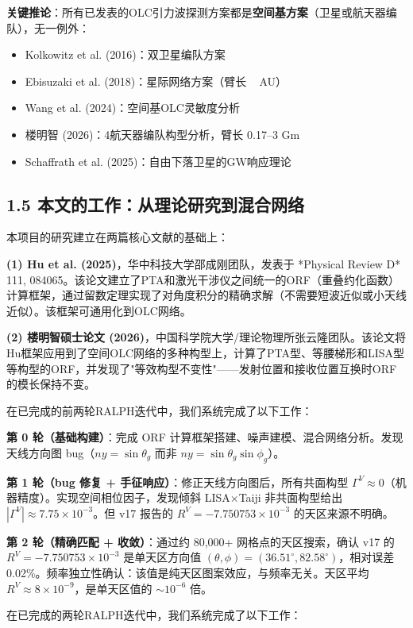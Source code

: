 \documentclass[12pt,a4paper]{article}
\begin{document}
\textbf{关键推论}：所有已发表的OLC引力波探测方案都是\textbf{空间基方案}（卫星或航天器编队），无一例外：
\begin{itemize}
  \item Kolkowitz et al. (2016)：双卫星编队方案
  \item Ebisuzaki et al. (2018)：星际网络方案（臂长 ~ AU）
  \item Wang et al. (2024)：空间基OLC灵敏度分析
  \item 楼明智 (2026)：4航天器编队构型分析，臂长 0.17–3 Gm
  \item Schaffrath et al. (2025)：自由下落卫星的GW响应理论
\end{itemize}
\subsection{1.5 本文的工作：从理论研究到混合网络}


本项目的研究建立在两篇核心文献的基础上：

\textbf{(1) Hu et al. (2025)}，华中科技大学邵成刚团队，发表于 *Physical Review D* 111, 084065\cite{ref9}。该论文建立了PTA和激光干涉仪之间统一的ORF（重叠约化函数）计算框架，通过留数定理实现了对角度积分的精确求解（不需要短波近似或小天线近似）。该框架可通用化到OLC网络。

\textbf{(2) 楼明智硕士论文 (2026)}，中国科学院大学/理论物理所张云隆团队\cite{ref10}。该论文将Hu框架应用到了空间OLC网络的多种构型上，计算了PTA型、等腰梯形和LISA型等构型的ORF，并发现了"等效构型不变性"——发射位置和接收位置互换时ORF的模长保持不变。

在已完成的前两轮RALPH迭代中，我们系统完成了以下工作：

\textbf{第 0 轮（基础构建）}：完成 ORF 计算框架搭建、噪声建模、混合网络分析。发现天线方向图 bug（$ny = \sin\theta_g$ 而非 $ny = \sin\theta_g\sin\phi_g$）。

\textbf{第 1 轮（bug 修复 + 手征响应）}：修正天线方向图后，所有共面构型 $\Gamma^V \approx 0$（机器精度）。实现空间相位因子，发现倾斜 LISA×Taiji 非共面构型给出 $|\Gamma^V| \approx 7.75\times 10^{-3}$。但 v17 报告的 $R^V = -7.750753\times 10^{-3}$ 的天区来源不明确。

\textbf{第 2 轮（精确匹配 + 收敛）}：通过约 80,000+ 网格点的天区搜索，确认 v17 的 $R^V = -7.750753\times 10^{-3}$ 是单天区方向值 $(\theta,\phi)=(36.51^\circ, 82.58^\circ)$，相对误差 0.02\%。频率独立性确认：该值是纯天区图案效应，与频率无关。天区平均 $R^V \approx 8\times 10^{-9}$，是单天区值的 $\sim 10^{-6}$ 倍。


在已完成的两轮RALPH迭代中，我们系统完成了以下工作：
\end{document}
